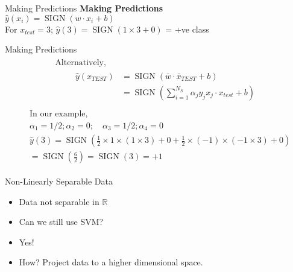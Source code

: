 \documentclass{beamer}
\begin{document}
\begin{frame}{Making Predictions}
\textbf{Making Predictions} \\
\hspace{2cm} $\hat{y}(x_i) = \operatorname{SIGN}(w \cdot x_i + b)$\\

For $x_{test} = 3$; $\hat{y}(3) = \operatorname{SIGN}(1 \times 3 + 0)$ = +ve class
\end{frame}

\begin{frame}{Making Predictions}\
\begin{align*}
\begin{array}{l}
{\text {Alternatively, }} \\
{\qquad \begin{aligned}
\hat{y}\left(x_{TEST}\right) &=\operatorname{SIGN}\left(\bar{w} \cdot \bar{x}_{TEST}+b\right) \\
&=\operatorname{SIGN} \left(\sum_{i=1}^{N_{S}} \alpha_{j} y_{j} x_{j} \cdot x_{test}+b\right)
\end{aligned}}
\end{array}
\end{align*}
\begin{align*}
\begin{aligned}
&\text{In our example,} \\
&\alpha_{1}=1/2 ; \alpha_{2}=0 ; \quad \alpha_{3}=1/2 ; \alpha_{4}=0\\
&\hat{y}(3) =\operatorname{SIGN}\left(\frac{1}{2} \times 1 \times (1 \times 3)+0+\frac{1}{2} \times (-1) \times (-1 \times 3)+0\right)\\
&=\operatorname{SIGN} \left(\frac{6}{2}\right)=\operatorname{SIGN}(3)=+1
\end{aligned}
\end{align*}

\end{frame}

{
	
}


	\begin{frame}{Non-Linearly Separable Data}
		\begin{itemize}[<+->]
			\item Data not separable in $\mathbb{R}$ 
		
	

	\item Can we still use SVM? 

	\item Yes!
	\item How? Project data to a higher dimensional space.
\end{itemize}
\end{frame}
\end{document}
